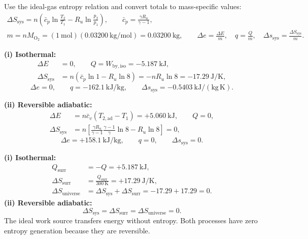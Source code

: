 Use the ideal-gas entropy relation and convert totals to mass-specific values:
\begin{gather*}
\Delta S_{\mathrm{sys}}
 =n\left(\bar c_p\ln\frac{T_2}{T_1}-R_u\ln\frac{p_2}{p_1}\right),
\qquad \bar c_p=\frac{\gamma R_u}{\gamma-1},\\
m=nM_{\mathrm{O_2}}=(1~\mathrm{mol})(0.03200~\mathrm{kg/mol})=0.03200~\mathrm{kg},
\qquad \Delta e=\frac{\Delta E}{m},\quad q=\frac{Q}{m},\quad
\Delta s_{\mathrm{sys}}=\frac{\Delta S_{\mathrm{sys}}}{m}.
\end{gather*}


\smallskip
\noindent\textbf{(i) Isothermal:}
\begin{align*}
\Delta E&=0,\qquad Q=W_{\mathrm{by,iso}}=-5.187~\mathrm{kJ},\\
\Delta S_{\mathrm{sys}}&=n\left(\bar c_p\ln1-R_u\ln8\right)
 =-nR_u\ln8=-17.29~\mathrm{J/K},
\end{align*}
\[
\boxed{\Delta e=0},\qquad
\boxed{q=-162.1~\mathrm{kJ/kg}},\qquad
\boxed{\Delta s_{\mathrm{sys}}=-0.5403~\mathrm{kJ/(kg\,K)}}.
\]

\smallskip
\noindent\textbf{(ii) Reversible adiabatic:}
\begin{align*}
\Delta E&=n\bar c_v(T_{2,\mathrm{ad}}-T_1)=+5.060~\mathrm{kJ},
\qquad Q=0,\\
\Delta S_{\mathrm{sys}}
&=n\left[\frac{\gamma R_u}{\gamma-1}
 \frac{\gamma-1}{\gamma}\ln8-R_u\ln8\right]=0,
\end{align*}
\[
\boxed{\Delta e=+158.1~\mathrm{kJ/kg}},\qquad
\boxed{q=0},\qquad \boxed{\Delta s_{\mathrm{sys}}=0}.
\]

\textbf{(i) Isothermal:} 
\begin{align*}
Q_{\mathrm{surr}}&=-Q=+5.187~\mathrm{kJ},\\
\Delta S_{\mathrm{surr}}&=\frac{Q_{\mathrm{surr}}}{300~\mathrm{K}}
 =+17.29~\mathrm{J/K},\\
\Delta S_{\mathrm{universe}}&=\Delta S_{\mathrm{sys}}+\Delta S_{\mathrm{surr}}
 =-17.29+17.29=\boxed{0}.
\end{align*}
\textbf{(ii) Reversible adiabatic:} 
\[
\boxed{\Delta S_{\mathrm{sys}}=\Delta S_{\mathrm{surr}}
=\Delta S_{\mathrm{universe}}=0.}
\]
The ideal work source transfers energy without entropy. Both processes have
zero entropy generation because they are reversible.

